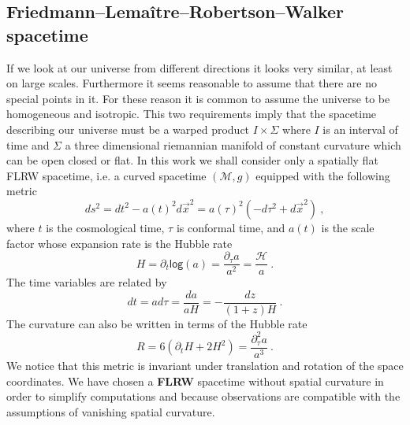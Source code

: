 \documentclass[11pt]{book}
\renewcommand{\log}{\mathsf{log}}
\newcommand{\Hcal}{\mathcal{H}}
\newcommand{\Mcal}{\mathcal{M}}
\theoremstyle{break}
\begin{document}
\subsection{Friedmann--Lemaître--Robertson--Walker spacetime}
\label{p:FLRW}


If we look at our universe from different directions it looks very similar, at least on large scales. Furthermore it seems reasonable to assume that there are no special points in it. For these reason it is common to assume the universe to be homogeneous and isotropic. This two requirements imply that the spacetime describing our universe must be a warped product $I\times \Sigma$ where $I$ is an interval of time and $\Sigma$ a three dimensional riemannian manifold of constant curvature which can be open closed or flat. In this work we shall consider only a spatially flat FLRW spacetime, i.e. a curved spacetime $(\Mcal,g)$ equipped with the following metric
%
\begin{equation*}
ds^2 = dt^2 - a(t)^2 d\vec{x}^2 = a(\tau)^2\left(-d\tau^2+d\vec{x}^2\right) \ ,
\end{equation*}
%
where $t$ is the cosmological time, $\tau$ is conformal time, and $a(t)$ is the scale factor whose expansion rate is the Hubble rate
%
\begin{equation*}
H = \partial_t \log (a) = \frac{\partial_\tau a}{a^2} = \frac{\Hcal}{a} \ .
\end{equation*}
%
The time variables are related by
%
\begin{equation*}
dt = a d\tau = \frac{da}{aH} = -\frac{dz}{(1+z)H} \ . 
\end{equation*}
% 
The curvature can also be written in terms of the Hubble rate
%
\begin{equation*}
R=6(\partial_t H + 2 H^2)=\frac{\partial^2_\tau a}{a^3} \ . 
\label{eq:rflrw}
\end{equation*}
%
We notice that this metric is invariant under translation and rotation of the space coordinates. We have chosen a \textbf{FLRW} spacetime without spatial curvature in order to simplify computations and because observations are compatible with the assumptions of vanishing spatial curvature. 


\nocite{*}




\end{document}
